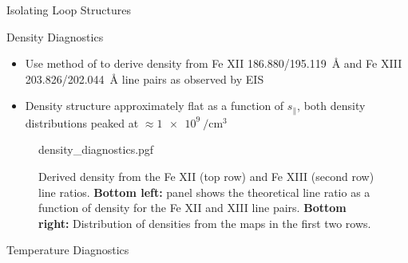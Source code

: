 \documentclass[final]{beamer}
\newlength{\colwidth}
\begin{document}
\begin{frame}[t]
\begin{columns}[t]
\begin{column}{\colwidth}
\begin{block}{Isolating Loop Structures}
  \end{block}
  \vspace{-30px}
  \begin{block}{Density Diagnostics}

    \begin{itemize}
      \item Use method of \citet{young_high-precision_2009} to derive density from Fe XII \SI{186.880/195.119}{\angstrom} and Fe XIII \SI{203.826/202.044}{\angstrom} line pairs as observed by EIS
      \item Density structure approximately flat as a function of $s_\parallel$, both density distributions peaked at $\approx\SI{1e9}{\per\cm\cubed}$
    \end{itemize}
    \vspace{-50pt}
    \begin{figure}
      \centering
      {density_diagnostics.pgf}
      \caption{Derived density from the Fe XII (top row) and Fe XIII (second row) line ratios. \textbf{Bottom left:} panel shows the theoretical line ratio as a function of density for the Fe XII and XIII line pairs. \textbf{Bottom right:} Distribution of densities from the maps in the first two rows.}
      \label{fig:density_diagnostic}   
    \end{figure}

  \end{block}
  \vspace{-30pt}
  \begin{block}{Temperature Diagnostics}


\end{block}
\end{column}
\end{columns}
\end{frame}
\end{document}
